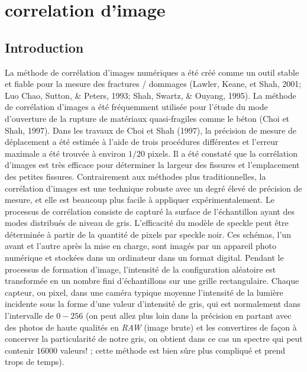 \documentclass{DGC_M2_report}
\begin{document}
\chapter{correlation d'image}
\section{Introduction}
La méthode de corrélation d'images numériques a été créé comme un outil stable et fiable pour la
mesure des fractures / dommages (Lawler, Keane, et Shah, 2001; Luo Chao, Sutton, & Peters,
1993; Shah, Swartz, & Ouyang, 1995). La méthode de corrélation d'images a été fréquemment
utilisée pour l'étude du mode d'ouverture de la rupture de matériaux quasi-fragiles comme le
béton (Choi et Shah, 1997). Dans les travaux de Choi et Shah (1997), la précision de mesure de
déplacement a été estimée à l'aide de trois procédures différentes et l'erreur maximale a été
trouvée à environ $1/20$ pixels. Il a été constaté que la corrélation d'images est très efficace pour
déterminer la largeur des fissures et l'emplacement des petites fissures.
Contrairement aux méthodes plus traditionnelles, la corrélation d'images est une
technique robuste avec un degré élevé de précision de mesure, et elle est beaucoup plus facile à
appliquer expérimentalement. Le processus de corrélation consiste de capturé la surface de
l'échantillon ayant des modes distribués de niveau de gris. L'efficacité du modèle de speckle peut
être déterminée à partir de la quantité de pixels par speckle noir. Ces schémas, l'un avant et
l'autre après la mise en charge, sont imagés par un appareil photo numérique et stockées dans un
ordinateur dans un format digital. Pendant le processus de formation d'image, l'intensité de la
configuration aléatoire est transformée en un nombre fini d'échantillons sur une grille
rectangulaire. Chaque capteur, ou pixel, dans une caméra typique moyenne l'intensité de la
lumière incidente sous la forme d'une valeur d'intensité de gris, qui est normalement dans
l'intervalle de $0-256$ (on peut allez plus loin dans la précision en partant avec des photos de haute qualités en \emph{RAW} (image brute) et les convertires de façon à concerver la particularité de notre gris, on obtient dans ce cas un spectre qui peut contenir $16000$ valeurs! ; cette méthode est bien sûre plus compliqué et prend trops de temps).
\end{document}
